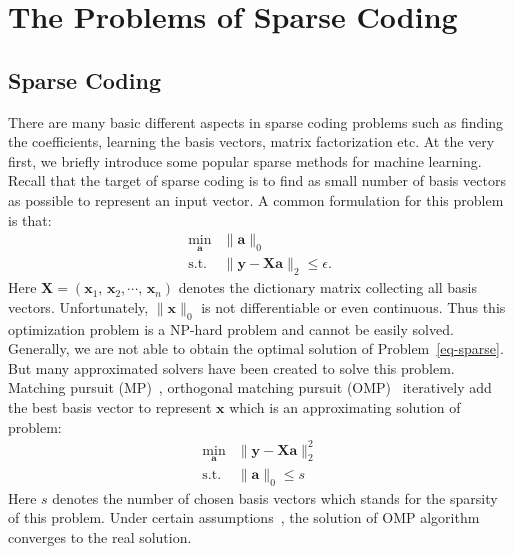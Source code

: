 \section{The Problems of Sparse Coding}
\label{sec:problem of SR}
\subsection{Sparse Coding}
\label{subsec:sparse coding}


There are many basic different aspects in sparse coding problems such as finding the coefficients, learning the basis vectors, matrix factorization etc.
At the very first, we briefly introduce some popular sparse methods for machine learning.
Recall that the target of sparse coding is to find as small number of basis vectors as possible to represent an input vector.
A common formulation for this problem is that:
\begin{equation}
\begin{array}{cl}
\min_{\mathbf{a}} & \|\mathbf{a}\|_0\\
\mathrm{s.t.} & \|\mathbf{y}-\mathbf{X}\mathbf{a}\|_2 \leq \epsilon.
\end{array}
\label{eq-sparse}
\end{equation}
Here $\mathbf{X}=(\mathbf{x}_1,\,\mathbf{x}_2,\cdots ,\,\mathbf{x}_n)$ denotes the dictionary matrix collecting all basis vectors.
Unfortunately, $\|\mathbf{x}\|_0$ is not differentiable or even continuous.
Thus this optimization problem is a NP-hard problem and cannot be easily solved.
Generally, we are not able to obtain the optimal solution of Problem~\ref{eq-sparse}.
But many approximated solvers have been created to solve this problem.
Matching pursuit (MP)~\cite{mallat1993matching}, orthogonal matching pursuit (OMP)~\cite{pati1993orthogonal,tropp2007signal} iteratively add the best basis vector to represent $\mathbf{x}$ which is an approximating solution of problem:
\begin{equation}
\begin{array}{cl}
\min_{\mathbf{a}} & \|\mathbf{y}-\mathbf{X}\mathbf{a}\|_2^2 \\
\mathrm{s.t.} & \|\mathbf{a}\|_0 \leq s
\end{array}
\end{equation}
Here $s$ denotes the number of chosen basis vectors which stands for the sparsity of this problem.
Under certain assumptions~\cite{pati1993orthogonal}, the solution of OMP algorithm converges to the real solution.

